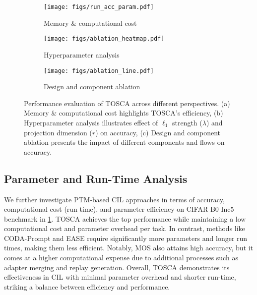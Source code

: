 \begin{figure}[h]
\captionsetup{font=small}
  \centering
  \begin{subfigure}{0.327\textwidth}
    \texttt{[image: figs/run\_acc\_param.pdf]}
    \caption{Memory \& computational cost}
    \label{fig:params}
  \end{subfigure}
  \begin{subfigure}{0.327\textwidth}
    \texttt{[image: figs/ablation\_heatmap.pdf]}
    \caption{Hyperparameter analysis}
    \label{fig:abla_heat}
  \end{subfigure}
  \begin{subfigure}{0.327\textwidth}
    \texttt{[image: figs/ablation\_line.pdf]}
    \caption{Design and component ablation}
    \label{fig:abla_line}
  \end{subfigure}
\caption{Performance evaluation of TOSCA across different perspectives. (a) Memory \& computational cost highlights TOSCA’s efficiency, (b) Hyperparameter analysis illustrates effect of $\ell_1$ strength ($\lambda$) and projection dimension ($r$) on accuracy, (c) Design and component ablation presents the impact of different components and flows on accuracy.}
  \vskip -0.25cm
\end{figure}

\subsection{Parameter and Run-Time Analysis}
We further investigate PTM-based CIL approaches in terms of accuracy, computational cost (run time), and parameter efficiency on CIFAR B0 Inc5 benchmark in \cref{fig:params}. TOSCA achieves the top performance while maintaining a low computational cost and parameter overhead per task. In contrast, methods like CODA-Prompt and EASE require significantly more parameters and longer run times, making them less efficient. Notably, MOS also attains high accuracy, but it comes at a higher computational expense due to additional processes such as adapter merging and replay generation. Overall, TOSCA demonstrates its effectiveness in CIL with minimal parameter overhead and shorter run-time, striking a balance between efficiency and performance.

